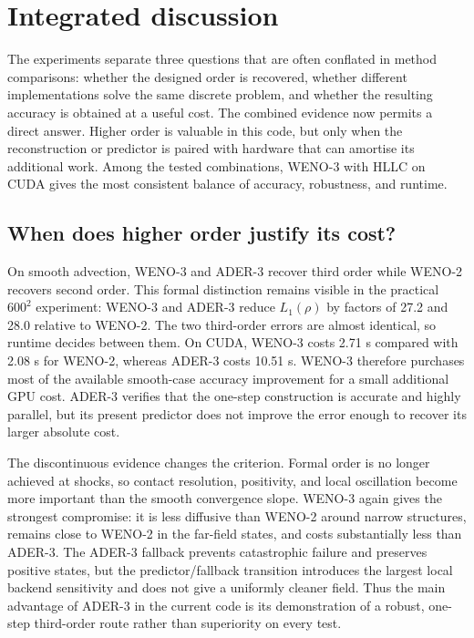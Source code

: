 \chapter{Integrated discussion}
\label{chap:discussion}

The experiments separate three questions that are often conflated in method comparisons:
whether the designed order is recovered, whether different implementations solve the same
discrete problem, and whether the resulting accuracy is obtained at a useful cost.  The
combined evidence now permits a direct answer.  Higher order is valuable in this code, but
only when the reconstruction or predictor is paired with hardware that can amortise its
additional work.  Among the tested combinations, WENO-3 with HLLC on CUDA gives the most
consistent balance of accuracy, robustness, and runtime.

\section{When does higher order justify its cost?}

On smooth advection, WENO-3 and ADER-3 recover third order while WENO-2 recovers second
order.  This formal distinction remains visible in the practical \(600^2\) experiment:
WENO-3 and ADER-3 reduce \(L_1(\rho)\) by factors of 27.2 and 28.0 relative to WENO-2.
The two third-order errors are almost identical, so runtime decides between them.  On CUDA,
WENO-3 costs 2.71 s compared with 2.08 s for WENO-2, whereas ADER-3 costs 10.51 s.
WENO-3 therefore purchases most of the available smooth-case accuracy improvement for a
small additional GPU cost.  ADER-3 verifies that the one-step construction is accurate and
highly parallel, but its present predictor does not improve the error enough to recover its
larger absolute cost.

The discontinuous evidence changes the criterion.  Formal order is no longer achieved at
shocks, so contact resolution, positivity, and local oscillation become more important
than the smooth convergence slope.  WENO-3 again gives the strongest compromise: it is
less diffusive than WENO-2 around narrow structures, remains close to WENO-2 in the
far-field states, and costs substantially less than ADER-3.  The ADER-3 fallback prevents
catastrophic failure and preserves positive states, but the predictor/fallback transition
introduces the largest local backend sensitivity and does not give a uniformly cleaner
field.  Thus the main advantage of ADER-3 in the current code is its demonstration of a
robust, one-step third-order route rather than superiority on every test.

